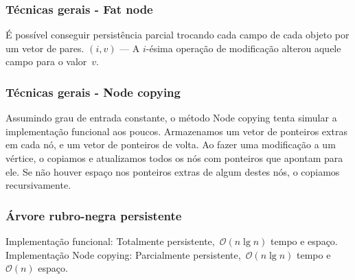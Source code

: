 \documentclass[10pt, compress]{beamer}
\newcommand{\Oh}{\mathcal{O}}
\begin{document}
\begin{frame}[fragile]
	\frametitle{Técnicas gerais - Fat node}

	É possível conseguir persistência parcial trocando cada campo de cada objeto por um vetor de pares.
	\vfill
	$(i, v)$ --- A $i$-ésima operação de modificação alterou aquele campo para o valor~$v$.
	\vfill

\end{frame}

\begin{frame}[fragile]
	\frametitle{Técnicas gerais - Node copying}

	Assumindo grau de entrada constante, o método Node copying tenta simular a implementação funcional aos poucos.
	\vfill
	Armazenamos um vetor de ponteiros extras em cada nó, e um vetor de ponteiros de volta.
	\vfill
	Ao fazer uma modificação a um vértice, o copiamos e atualizamos todos os nós com ponteiros que apontam para ele.
	\vfill
	Se não houver espaço nos ponteiros extras de algum destes nós, o copiamos recursivamente.
\end{frame}

\begin{frame}[fragile]
	\frametitle{Árvore rubro-negra persistente}
	Implementação funcional: Totalmente persistente,~$\Oh(n \lg n)$ tempo e espaço.
	\vfill
	Implementação Node copying: Parcialmente persistente,~$\Oh(n \lg n)$ tempo e~$\Oh(n)$ espaço.
	\vfill

\end{frame}
\end{document}
